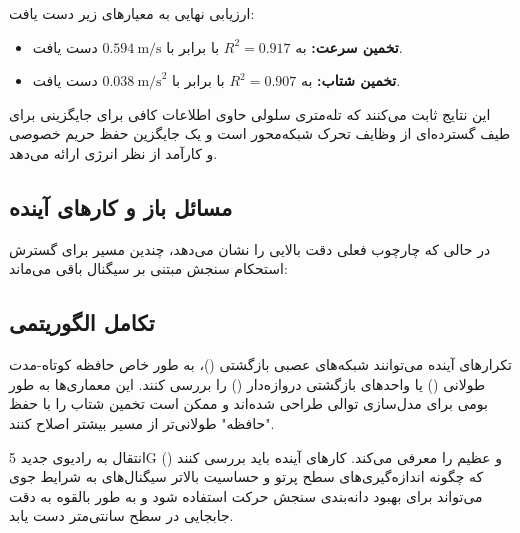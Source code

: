 \documentclass{CSICC}
\begin{document}
ارزیابی نهایی به معیارهای زیر دست یافت:
\begin{itemize}
\item \textbf{تخمین سرعت:} به \( R^{2} = 0.917 \) با  برابر با \( 0.594~\text{m/s} \) دست یافت.

\item \textbf{تخمین شتاب:} به \( R^{2} = 0.907 \) با  برابر با \( 0.038~\text{m/s}^{2} \) دست یافت.
\end{itemize}

این نتایج ثابت می‌کنند که تله‌متری سلولی حاوی اطلاعات کافی برای جایگزینی  برای طیف گسترده‌ای از وظایف تحرک شبکه‌محور است و یک جایگزین حفظ حریم خصوصی و کارآمد از نظر انرژی ارائه می‌دهد.

\subsection{مسائل باز و کارهای آینده}
در حالی که چارچوب فعلی دقت بالایی را نشان می‌دهد، چندین مسیر برای گسترش استحکام سنجش مبتنی بر سیگنال باقی می‌ماند:

\subsection{تکامل الگوریتمی}
تکرارهای آینده می‌توانند شبکه‌های عصبی بازگشتی ()، به طور خاص حافظه کوتاه-مدت طولانی () یا واحدهای بازگشتی دروازه‌دار () را بررسی کنند. این معماری‌ها به طور بومی برای مدل‌سازی توالی طراحی شده‌اند و ممکن است تخمین شتاب را با حفظ "حافظه" طولانی‌تر از مسیر  بیشتر اصلاح کنند.

انتقال به رادیوی جدید 5G ()  و  عظیم را معرفی می‌کند. کارهای آینده باید بررسی کنند که چگونه اندازه‌گیری‌های سطح پرتو و حساسیت بالاتر سیگنال‌های  به شرایط جوی می‌تواند برای بهبود دانه‌بندی سنجش حرکت استفاده شود و به طور بالقوه به دقت جابجایی در سطح سانتی‌متر دست یابد.
\end{document}
